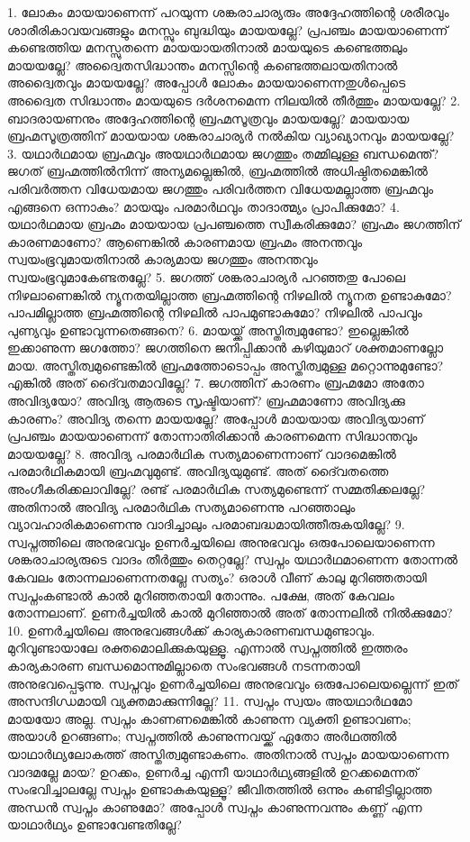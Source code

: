 1. ലോകം മായയാണെന്ന് പറയുന്ന ശങ്കരാചാര്യരും അദ്ദേഹത്തിന്റെ ശരീരവും ശാരീരികാവയവങ്ങളും മനസ്സും ബുദ്ധിയും മായയല്ലേ? പ്രപഞ്ചം മായയാണെന്ന് കണ്ടെത്തിയ മനസ്സുതന്നെ മായയായതിനാല്‍ മായയുടെ കണ്ടെത്തലും മായയല്ലേ? അദ്വൈതസിദ്ധാന്തം മനസ്സിന്റെ കണ്ടെത്തലായതിനാല്‍ അദ്വൈതവും മായയല്ലേ? അപ്പോള്‍ ലോകം മായയാണെന്നതുള്‍പ്പെടെ അദ്വൈത സിദ്ധാന്തം മായയുടെ ദര്‍ശനമെന്ന നിലയില്‍ തീര്‍ത്തും മായയല്ലേ?
2. ബാദരായണനും അദ്ദേഹത്തിന്റെ ബ്രഹ്മസൂത്രവും മായയല്ലേ? മായയായ ബ്രഹ്മസൂത്രത്തിന് മായയായ ശങ്കരാചാര്യര്‍ നല്‍കിയ വ്യാഖ്യാനവും മായയല്ലേ?
3. യഥാര്‍ഥമായ ബ്രഹ്മവും അയഥാര്‍ഥമായ ജഗത്തും തമ്മിലുള്ള ബന്ധമെന്ത്? ജഗത് ബ്രഹ്മത്തില്‍നിന്ന് അന്യമല്ലെങ്കില്‍, ബ്രഹ്മത്തില്‍ അധിഷ്ഠിതമെങ്കില്‍ പരിവര്‍ത്തന വിധേയമായ ജഗത്തും പരിവര്‍ത്തന വിധേയമല്ലാത്ത ബ്രഹ്മവും എങ്ങനെ ഒന്നാകും? മായയും പരമാര്‍ഥവും താദാത്മ്യം പ്രാപിക്കുമോ?
4. യഥാര്‍ഥമായ ബ്രഹ്മം മായയായ പ്രപഞ്ചത്തെ സ്വീകരിക്കുമോ? ബ്രഹ്മം ജഗത്തിന് കാരണമാണോ? ആണെങ്കില്‍ കാരണമായ ബ്രഹ്മം അനന്തവും സ്വയംഭൂവുമായതിനാല്‍ കാര്യമായ ജഗത്തും അനന്തവും സ്വയംഭൂവുമാകേണ്ടതല്ലേ?
5. ജഗത്ത് ശങ്കരാചാര്യര്‍ പറഞ്ഞതു പോലെ നിഴലാണെങ്കില്‍ ന്യൂനതയില്ലാത്ത ബ്രഹ്മത്തിന്റെ നിഴലില്‍ ന്യൂനത ഉണ്ടാകുമോ? പാപമില്ലാത്ത ബ്രഹ്മത്തിന്റെ നിഴലില്‍ പാപമുണ്ടാകുമോ? നിഴലില്‍ പാപവും പുണ്യവും ഉണ്ടാവുന്നതെങ്ങനെ?
6. മായയ്ക്ക് അസ്തിത്വമുണ്ടോ? ഇല്ലെങ്കില്‍ ഇക്കാണുന്ന ജഗത്തോ? ജഗത്തിനെ ജനിപ്പിക്കാന്‍ കഴിയുമാറ് ശക്തമാണല്ലോ മായ. അസ്തിത്വമുണ്ടെങ്കില്‍ ബ്രഹ്മത്തോടൊപ്പം അസ്തിത്വമുള്ള മറ്റൊന്നുമുണ്ടോ? എങ്കില്‍ അത് ദൈ്വതമാവില്ലേ?
7. ജഗത്തിന് കാരണം ബ്രഹ്മമോ അതോ അവിദ്യയോ? അവിദ്യ ആരുടെ സൃഷ്ടിയാണ്? ബ്രഹ്മമാണോ അവിദ്യക്കു കാരണം? അവിദ്യ തന്നെ മായയല്ലേ? അപ്പോള്‍ മായയായ അവിദ്യയാണ് പ്രപഞ്ചം മായയാണെന്ന് തോന്നാതിരിക്കാന്‍ കാരണമെന്ന സിദ്ധാന്തവും മായയല്ലേ?
8. അവിദ്യ പരമാര്‍ഥിക സത്യമാണെന്നാണ് വാദമെങ്കില്‍ പരമാര്‍ഥികമായി ബ്രഹ്മവുമുണ്ട്. അവിദ്യയുമുണ്ട്. അത് ദൈ്വതത്തെ അംഗീകരിക്കലാവില്ലേ? രണ്ട് പരമാര്‍ഥിക സത്യമുണ്ടെന്ന് സമ്മതിക്കലല്ലേ? അതിനാല്‍ അവിദ്യ പരമാര്‍ഥിക സത്യമാണെന്നു പറഞ്ഞാലും വ്യാവഹാരികമാണെന്നു വാദിച്ചാലും പരമാബദ്ധമായിത്തീരുകയില്ലേ?
9. സ്വപ്നത്തിലെ അനുഭവവും ഉണര്‍ച്ചയിലെ അനുഭവവും ഒരുപോലെയാണെന്ന ശങ്കരാചാര്യരുടെ വാദം തീര്‍ത്തും തെറ്റല്ലേ? സ്വപ്നം യഥാര്‍ഥമാണെന്ന തോന്നല്‍ കേവലം തോന്നലാണെന്നതല്ലേ സത്യം? ഒരാള്‍ വീണ് കാലു മുറിഞ്ഞതായി സ്വപ്നംകണ്ടാല്‍ കാല്‍ മുറിഞ്ഞതായി തോന്നും. പക്ഷേ, അത് കേവലം തോന്നലാണ്. ഉണര്‍ച്ചയില്‍ കാല്‍ മുറിഞ്ഞാല്‍ അത് തോന്നലില്‍ നില്‍ക്കുമോ?
10. ഉണര്‍ച്ചയിലെ അനുഭവങ്ങള്‍ക്ക് കാര്യകാരണബന്ധമുണ്ടാവും. മുറിവുണ്ടായാലേ രക്തമൊലിക്കുകയുള്ളൂ. എന്നാല്‍ സ്വപ്നത്തില്‍ ഇത്തരം കാര്യകാരണ ബന്ധമൊന്നുമില്ലാതെ സംഭവങ്ങള്‍ നടന്നതായി അനുഭവപ്പെടുന്നു. സ്വപ്നവും ഉണര്‍ച്ചയിലെ അനുഭവവും ഒരുപോലെയല്ലെന്ന് ഇത് അസന്ദിഗ്ധമായി വ്യക്തമാക്കുന്നില്ലേ?
11. സ്വപ്നം സ്വയം അയഥാര്‍ഥമോ മായയോ അല്ല. സ്വപ്നം കാണണമെങ്കില്‍ കാണുന്ന വ്യക്തി ഉണ്ടാവണം; അയാള്‍ ഉറങ്ങണം; സ്വപ്നത്തില്‍ കാണുന്നവയ്ക്ക് ഏതോ അര്‍ഥത്തില്‍ യാഥാര്‍ഥ്യലോകത്ത് അസ്തിത്വമുണ്ടാകണം. അതിനാല്‍ സ്വപ്നം മായയാണെന്ന വാദമല്ലേ മായ? ഉറക്കം, ഉണര്‍ച്ച എന്നീ യാഥാര്‍ഥ്യങ്ങളില്‍ ഉറക്കമെന്നത് സംഭവിച്ചാലല്ലേ സ്വപ്നം ഉണ്ടാകുകയുള്ളൂ? ജീവിതത്തില്‍ ഒന്നും കണ്ടിട്ടില്ലാത്ത അന്ധന്‍ സ്വപ്നം കാണുമോ? അപ്പോള്‍ സ്വപ്നം കാണുന്നവന്നും കണ്ണ് എന്ന യാഥാര്‍ഥ്യം ഉണ്ടാവേണ്ടതില്ലേ?
